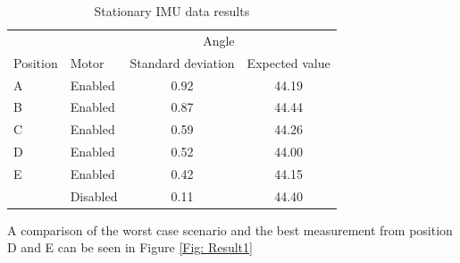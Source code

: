 \documentclass[a4paper,11pt]{kth-mag}
\begin{document}
\begin{table} [!hbt]
\centering
\begin{tabular}{@{}llcc@{}} \toprule
\multicolumn{3}{r}{Angle} \\ \cmidrule(r){3-4}
Position & Motor & Standard deviation & Expected value\\ \midrule
A  	 & Enabled 	& 0.92 & 44.19 \\
B    & Enabled 	& 0.87 & 44.44 \\
C  	 & Enabled 	& 0.59 & 44.26\\
D   	 & Enabled 	& 0.52 & 44.00\\
E	 & Enabled 	& 0.42 & 44.15\\
	 & Disabled	& 0.11 & 44.40\\ \bottomrule
 \end{tabular}
 \caption{Stationary IMU data results}
  \label{Table: Standard deviation}
\end{table}

A comparison of the worst case scenario and the best measurement from position D and E can be seen in Figure \ref{Fig: Result1}
\end{document}
